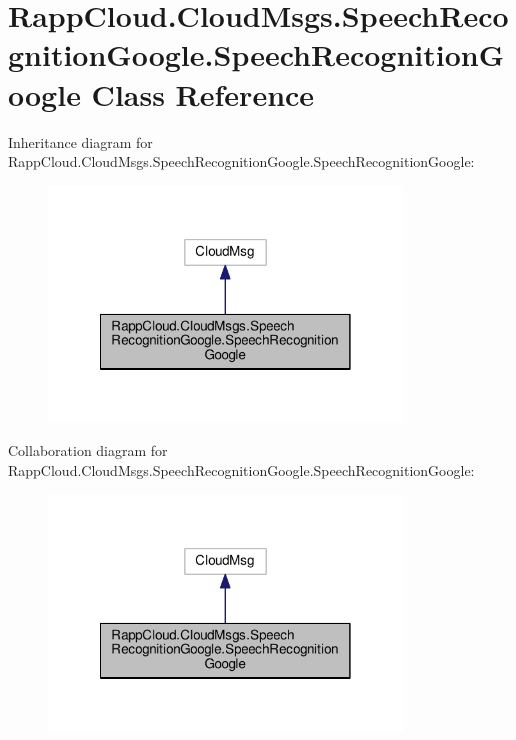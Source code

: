 \hypertarget{classRappCloud_1_1CloudMsgs_1_1SpeechRecognitionGoogle_1_1SpeechRecognitionGoogle}{\section{Rapp\-Cloud.\-Cloud\-Msgs.\-Speech\-Recognition\-Google.\-Speech\-Recognition\-Google Class Reference}
\label{classRappCloud_1_1CloudMsgs_1_1SpeechRecognitionGoogle_1_1SpeechRecognitionGoogle}
}


Inheritance diagram for Rapp\-Cloud.\-Cloud\-Msgs.\-Speech\-Recognition\-Google.\-Speech\-Recognition\-Google\-:
\nopagebreak
\begin{figure}[H]
\begin{center}
\leavevmode
\includegraphics[width=266pt]{classRappCloud_1_1CloudMsgs_1_1SpeechRecognitionGoogle_1_1SpeechRecognitionGoogle__inherit__graph}
\end{center}
\end{figure}


Collaboration diagram for Rapp\-Cloud.\-Cloud\-Msgs.\-Speech\-Recognition\-Google.\-Speech\-Recognition\-Google\-:
\nopagebreak
\begin{figure}[H]
\begin{center}
\leavevmode
\includegraphics[width=266pt]{classRappCloud_1_1CloudMsgs_1_1SpeechRecognitionGoogle_1_1SpeechRecognitionGoogle__coll__graph}
\end{center}
\end{figure}
